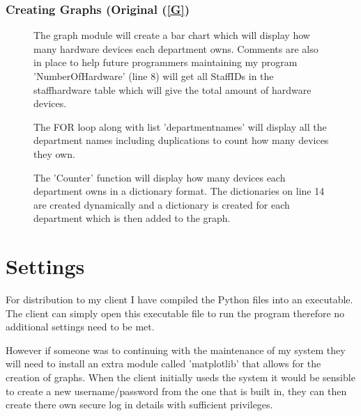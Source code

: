 \begin{landscape}
\subsubsection{Creating Graphs (Original (\ref{G})}

\begin{figure}[H]
    \caption{The graph module will create a bar chart which will display how many hardware devices each department owns. Comments are also in place to help future programmers maintaining my program \newline 'NumberOfHardware' (line 8) will get all StaffIDs in the staffhardware table which will give the total amount of hardware devices. }  
\end{figure}

\begin{figure}[H]
    \caption{The FOR loop along with list 'departmentnames' will display all the department names including duplications to count how many devices they own.}
\end{figure}

\begin{figure}[H]
    \caption{The 'Counter' function will display how many devices each department owns in a dictionary format. \newline The dictionaries on line 14 are created dynamically and a dictionary is created for each department which is then added to the graph.}
\end{figure}

\end{landscape}
\section{Settings}

For distribution to my client I have compiled the Python files into an executable. The client can simply open this executable file to run the program therefore no additional settings need to be met.

However if someone was to continuing with the maintenance of my system they will need to install an extra module called 'matplotlib' that allows for the creation of graphs. When the client initially useds the system it would be sensible to create a new username/password from the one that is built in, they can then create there own secure log in details with sufficient privileges.   

